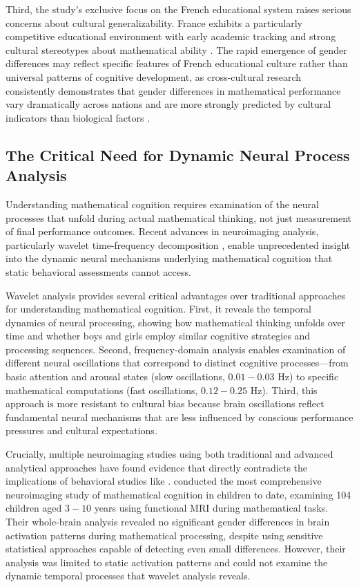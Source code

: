\documentclass[pdflatex,reference]{sn-jnl}%
\theoremstyle{thmstyleone}%
\theoremstyle{thmstyletwo}%
\theoremstyle{thmstylethree}%
\begin{document}
Third, the study's exclusive focus on the French educational system raises serious concerns about cultural generalizability. France exhibits a particularly competitive educational environment with early academic tracking and strong cultural stereotypes about mathematical ability \cite{guiso2008culture}. The rapid emergence of gender differences may reflect specific features of French educational culture rather than universal patterns of cognitive development, as cross-cultural research consistently demonstrates that gender differences in mathematical performance vary dramatically across nations and are more strongly predicted by cultural indicators than biological factors \cite{else2010cross}.

\subsection{The Critical Need for Dynamic Neural Process Analysis}
Understanding mathematical cognition requires examination of the neural processes that unfold during actual mathematical thinking, not just measurement of final performance outcomes. Recent advances in neuroimaging analysis, particularly wavelet time-frequency decomposition \cite{torrence1998practical,cohen2014analyzing}, enable unprecedented insight into the dynamic neural mechanisms underlying mathematical cognition that static behavioral assessments cannot access.

Wavelet analysis provides several critical advantages over traditional approaches for understanding mathematical cognition. First, it reveals the temporal dynamics of neural processing, showing how mathematical thinking unfolds over time and whether boys and girls employ similar cognitive strategies and processing sequences. Second, frequency-domain analysis enables examination of different neural oscillations that correspond to distinct cognitive processes—from basic attention and arousal states (slow oscillations, $0.01-0.03$ Hz) to specific mathematical computations (fast oscillations, $0.12-0.25$ Hz). Third, this approach is more resistant to cultural bias because brain oscillations reflect fundamental neural mechanisms that are less influenced by conscious performance pressures and cultural expectations.

Crucially, multiple neuroimaging studies using both traditional and advanced analytical approaches have found evidence that directly contradicts the implications of behavioral studies like \cite{martinot2025mathematical}. \cite{kersey2019no} conducted the most comprehensive neuroimaging study of mathematical cognition in children to date, examining 104 children aged $3-10$ years using functional MRI during mathematical tasks. Their whole-brain analysis revealed no significant gender differences in brain activation patterns during mathematical processing, despite using sensitive statistical approaches capable of detecting even small differences. However, their analysis was limited to static activation patterns and could not examine the dynamic temporal processes that wavelet analysis reveals.
\end{document}
